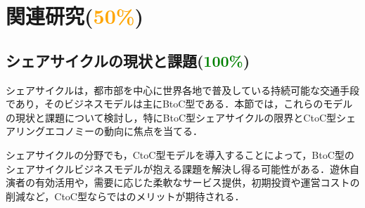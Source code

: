 \section{関連研究(\textcolor{orange}{50\%})}
  \label{sec:関連研究}
    \par
  
  \subsection{シェアサイクルの現状と課題(\textcolor{green}{100\%})}
    \label{sec:シェアサイクルの現状と課題}
      \par シェアサイクルは，都市部を中心に世界各地で普及している持続可能な交通手段であり，そのビジネスモデルは主にBtoC型である．本節では，これらのモデルの現状と課題について検討し，特にBtoC型シェアサイクルの限界とCtoC型シェアリングエコノミーの動向に焦点を当てる．
      \par シェアサイクルの分野でも，CtoC型モデルを導入することによって，BtoC型のシェアサイクルビジネスモデルが抱える課題を解決し得る可能性がある．遊休自演者の有効活用や，需要に応じた柔軟なサービス提供，初期投資や運営コストの削減など，CtoC型ならではのメリットが期待される．
      
